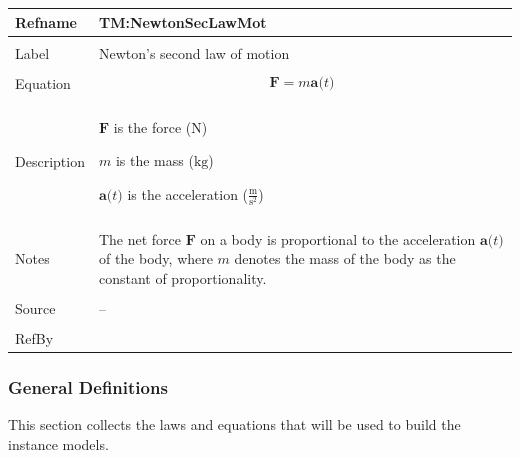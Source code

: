 \documentclass[12pt]{article}
\begin{document}
\begin{minipage}{\textwidth}
\begin{tabular}{>{\raggedright}p{}>{\raggedright\arraybackslash}p{}}
\toprule \textbf{Refname} & \textbf{TM:NewtonSecLawMot}
\label{TM:NewtonSecLawMot}
\\ \midrule \\
Label & Newton's second law of motion
        
\\ \midrule \\
Equation & \begin{displaymath}
           \symbf{F}=m \symbf{a}\text{(}t\text{)}
           \end{displaymath}
\\ \midrule \\
Description & \begin{symbDescription}
              \item{$\symbf{F}$ is the force (${\text{N}}$)}
              \item{$m$ is the mass (${\text{kg}}$)}
              \item{$\symbf{a}\text{(}t\text{)}$ is the acceleration ($\frac{\text{m}}{\text{s}^{2}}$)}
              \end{symbDescription}
\\ \midrule \\
Notes & The net force $\symbf{F}$ on a body is proportional to the acceleration $\symbf{a}\text{(}t\text{)}$ of the body, where $m$ denotes the mass of the body as the constant of proportionality.
        
\\ \midrule \\
Source & --
         
\\ \midrule \\
RefBy & 
\\ \bottomrule
\end{tabular}
\end{minipage}
\subsubsection{General Definitions}
\label{Sec:GDs}
This section collects the laws and equations that will be used to build the instance models.
\end{document}
